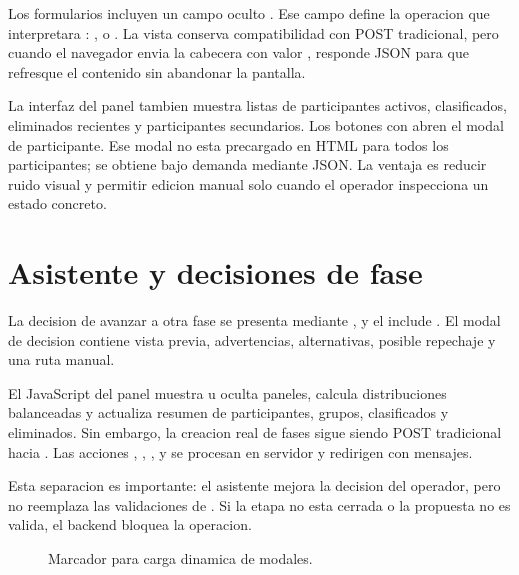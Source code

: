 Los formularios incluyen un campo oculto . Ese campo define la operacion que interpretara : ,  o . La vista conserva compatibilidad con POST tradicional, pero cuando el navegador envia la cabecera  con valor , responde JSON para que  refresque el contenido sin abandonar la pantalla.

La interfaz del panel tambien muestra listas de participantes activos, clasificados, eliminados recientes y participantes secundarios. Los botones con  abren el modal de participante. Ese modal no esta precargado en HTML para todos los participantes; se obtiene bajo demanda mediante JSON. La ventaja es reducir ruido visual y permitir edicion manual solo cuando el operador inspecciona un estado concreto.

\section{Asistente y decisiones de fase}
\label{sec:frontend-decisiones-fase}

La decision de avanzar a otra fase se presenta mediante ,  y el include . El modal de decision contiene vista previa, advertencias, alternativas, posible repechaje y una ruta manual.

El JavaScript del panel muestra u oculta paneles, calcula distribuciones balanceadas y actualiza resumen de participantes, grupos, clasificados y eliminados. Sin embargo, la creacion real de fases sigue siendo POST tradicional hacia . Las acciones , , ,  y  se procesan en servidor y redirigen con mensajes.

Esta separacion es importante: el asistente mejora la decision del operador, pero no reemplaza las validaciones de . Si la etapa no esta cerrada o la propuesta no es valida, el backend bloquea la operacion.

\begin{figure}[H]
  \centering
  \caption{Marcador para carga dinamica de modales.}
  \label{fig:frontend-modales-dinamicos}
\end{figure}

